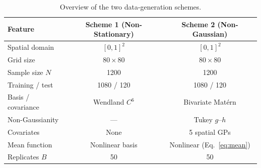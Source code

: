 \documentclass[11pt,a4paper]{article}
\begin{document}
\begin{table}[h]
\centering
\caption{Overview of the two data-generation schemes.}\label{tab:overview}
\smallskip
\begin{tabular}{@{}lcc@{}}
\toprule
Feature & Scheme 1 (Non-Stationary) & Scheme 2 (Non-Gaussian) \\
\midrule
Spatial domain     & $[0,1]^2$       & $[0,1]^2$ \\
Grid size          & $80\times80$    & $80\times80$ \\
Sample size $N$    & 1200            & 1200 \\
Training / test    & 1080 / 120      & 1080 / 120 \\
Basis / covariance & Wendland $C^6$  & Bivariate Mat\'ern \\
Non-Gaussianity    & ---             & Tukey $g$--$h$ \\
Covariates         & None            & 5 spatial GPs \\
Mean function      & Nonlinear basis & Nonlinear (Eq.~\ref{eq:mean}) \\
Replicates $B$     & 50              & 50 \\
\bottomrule
\end{tabular}
\end{table}
\end{document}
